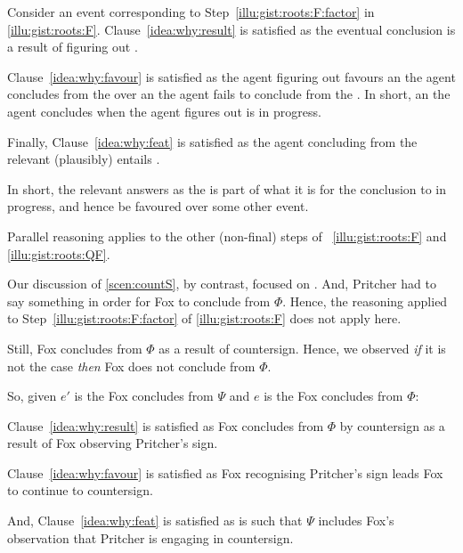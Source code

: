 \begin{note}
  Consider an event corresponding to Step~\ref{illu:gist:roots:F:factor} in \autoref{illu:gist:roots:F}.
  Clause~\ref{idea:why:result} is satisfied as the eventual conclusion is a result of figuring out \rootsConEqFac{}.

  Clause~\ref{idea:why:favour} is satisfied as the agent figuring out \rootsConEqFac{} favours an  the agent concludes  from the \pool{} over an  the agent fails to conclude  from the \pool{}.
  In short, an  the agent concludes  when the agent figures out \rootsConEqFac{} is in progress.

  Finally, Clause~\ref{idea:why:feat} is satisfied as the agent concluding  from the relevant \pool{} (plausibly) entails .
\end{note}


\begin{note}
  In short, the relevant  answers \qWhy{} as the \fofr{} is part of what it is for the conclusion to in progress, and hence be favoured over some other event.

  Parallel reasoning applies to the other (non-final) steps of ~\ref{illu:gist:roots:F} and \ref{illu:gist:roots:QF}.
\end{note}


\begin{note}
  Our discussion of \autoref{scen:countS}, by contrast, focused on .
  And, Pritcher had to say something in order for Fox to conclude  from \(\Phi\).
  Hence, the reasoning applied to Step~\ref{illu:gist:roots:F:factor} of \autoref{illu:gist:roots:F} does not apply here.

  Still, Fox concludes  from \(\Phi\) as a result of countersign.
  Hence, we observed \emph{if} it is not the case  \emph{then} Fox does not conclude  from \(\Phi\).

  So, given \(e'\) is the  Fox concludes  from \(\Psi\) and \(e\) is the  Fox concludes  from \(\Phi\):

  Clause~\ref{idea:why:result} is satisfied as Fox concludes  from \(\Phi\) by countersign as a result of Fox observing Pritcher's sign.

  Clause~\ref{idea:why:favour} is satisfied as Fox recognising Pritcher's sign leads Fox to continue to countersign.

  And, Clause~\ref{idea:why:feat} is satisfied as  is such that \(\Psi\) includes Fox's observation that Pritcher is engaging in countersign.
\end{note}




